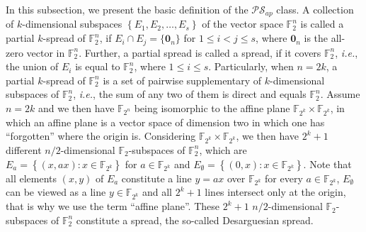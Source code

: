 \documentclass{article}
\newcommand{\F}{\mathbb{F}}
\newcommand{\0}{\textbf{0}}
\newcommand{\1}{\textbf{1}}
\theoremstyle{plain}
\begin{document}
In this subsection, we present the basic definition of the $\mathcal{PS}_{ap}$ class.
A collection of $k$-dimensional subspaces $\left\{ E_1,E_2,\dots,E_s \right\}$ of the vector space $\F_2^n$ is called a partial $k$-spread of $\F_2^n$,
if $E_i\cap E_j = \{\bm{0}_n\}$ for $1\le i<j\le s$, where $\bm{0}_n$ is the all-zero vector in $\F_2^n$.
Further, a partial spread is called a spread, if it covers $\F_2^n$, \emph{i.e.}, the union of $E_i$ is equal to $\F_2^n$, where $1\le i\le s$.
Particularly, when $n=2k$, a partial $k$-spread of $\F_2^n$ is a set of pairwise supplementary of $k$-dimensional subspaces of $\F_2^n$,
\emph{i.e.},  the sum of any two of them is direct and equals $\F_2^n$.
Assume $n=2k$ and we then have $\F_{2^n}$ being isomorphic to the affine plane $\F_{2^k}\times\F_{2^k}$,
in which  an affine plane is a vector space of dimension two in which one has ``forgotten'' where the origin is.
Considering $\F_{2^k}\times\F_{2^k}$, we then have $2^k+1$ different $n/2$-dimensional $\F_2$-subspaces of $\F_2^n$, which are 
$E_a=\left\{(x,ax) : x\in\F_{2^k}\right\}$ for $a\in\F_{2^k}$ and $E_{\emptyset}=\left\{(0,x) : x\in\F_{2^k}\right\}$.
Note that all elements $(x,y)$ of $E_a$ constitute a line $y=ax$ over $\F_{2^k}$ for every $a\in\F_{2^k}$, $E_{\emptyset}$ can be viewed as a line $y\in\F_{2^k}$ and all $2^k+1$ lines intersect only at the origin, that is why we use the term ``affine plane''.
These $2^k+1$ $n/2$-dimensional $\F_2$-subspaces of $\F_2^n$ constitute a spread, the so-called Desarguesian spread.
\end{document}

